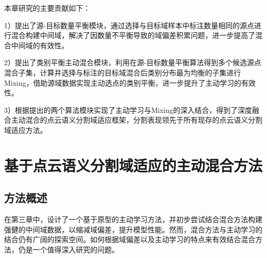     本章研究的主要贡献如下：

    1）提出了源-目标数量平衡模块，通过选择与目标域样本中标注数量相同的源点进行混合构建中间域，解决了因数量不平衡导致的域偏差积累问题，进一步提高了混合中间域的有效性。

    2）提出了类别平衡主动混合模块，利用在源-目标数量平衡算法得到多个候选源点混合子集，计算并选择与标注的目标域混合后类别分布最为均衡的子集进行Mixing，借助源域数据实现主动选点的类别平衡，进一步提升了主动学习的有效性。

    3）根据提出的两个算法模块实现了主动学习与Mixing的深入结合，得到了深度融合主动混合的点云语义分割域适应框架，分割表现领先于所有现存的点云语义分割域适应方法。


    \section{基于点云语义分割域适应的主动混合方法}
    \subsection{方法概述}%
    在第三章中，设计了一个基于原型的主动学习方法，并初步尝试结合混合方法构建强健的中间域数据，以缩减域偏差，提升模型性能。然而，混合方法与主动学习的结合仍有广阔的探索空间。如何根据域偏差以及主动学习的特点来有效结合混合方法，仍是一个值得深入研究的问题。

